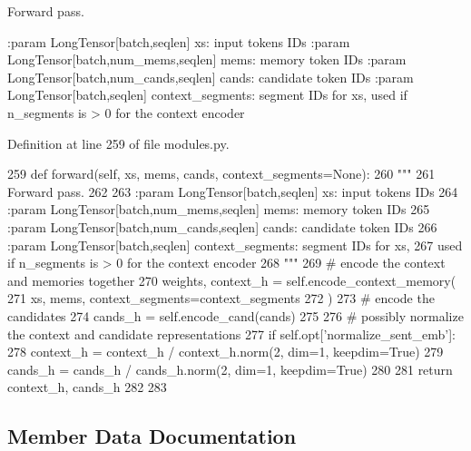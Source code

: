 \begin{DoxyVerb}Forward pass.

:param LongTensor[batch,seqlen] xs: input tokens IDs
:param LongTensor[batch,num_mems,seqlen] mems: memory token IDs
:param LongTensor[batch,num_cands,seqlen] cands: candidate token IDs
:param LongTensor[batch,seqlen] context_segments: segment IDs for xs,
    used if n_segments is > 0 for the context encoder
\end{DoxyVerb}
 

Definition at line 259 of file modules.\+py.


\begin{DoxyCode}
259     \textcolor{keyword}{def }forward(self, xs, mems, cands, context\_segments=None):
260         \textcolor{stringliteral}{"""}
261 \textcolor{stringliteral}{        Forward pass.}
262 \textcolor{stringliteral}{}
263 \textcolor{stringliteral}{        :param LongTensor[batch,seqlen] xs: input tokens IDs}
264 \textcolor{stringliteral}{        :param LongTensor[batch,num\_mems,seqlen] mems: memory token IDs}
265 \textcolor{stringliteral}{        :param LongTensor[batch,num\_cands,seqlen] cands: candidate token IDs}
266 \textcolor{stringliteral}{        :param LongTensor[batch,seqlen] context\_segments: segment IDs for xs,}
267 \textcolor{stringliteral}{            used if n\_segments is > 0 for the context encoder}
268 \textcolor{stringliteral}{        """}
269         \textcolor{comment}{# encode the context and memories together}
270         weights, context\_h = self.encode\_context\_memory(
271             xs, mems, context\_segments=context\_segments
272         )
273         \textcolor{comment}{# encode the candidates}
274         cands\_h = self.encode\_cand(cands)
275 
276         \textcolor{comment}{# possibly normalize the context and candidate representations}
277         \textcolor{keywordflow}{if} self.opt[\textcolor{stringliteral}{'normalize\_sent\_emb'}]:
278             context\_h = context\_h / context\_h.norm(2, dim=1, keepdim=\textcolor{keyword}{True})
279             cands\_h = cands\_h / cands\_h.norm(2, dim=1, keepdim=\textcolor{keyword}{True})
280 
281         \textcolor{keywordflow}{return} context\_h, cands\_h
282 
283 
\end{DoxyCode}


\subsection{Member Data Documentation}
\mbox{\label{classparlai_1_1agents_1_1transformer_1_1modules_1_1TransformerMemNetModel_a95c72e762694a7017243bfcf0b37a1e7}} 
